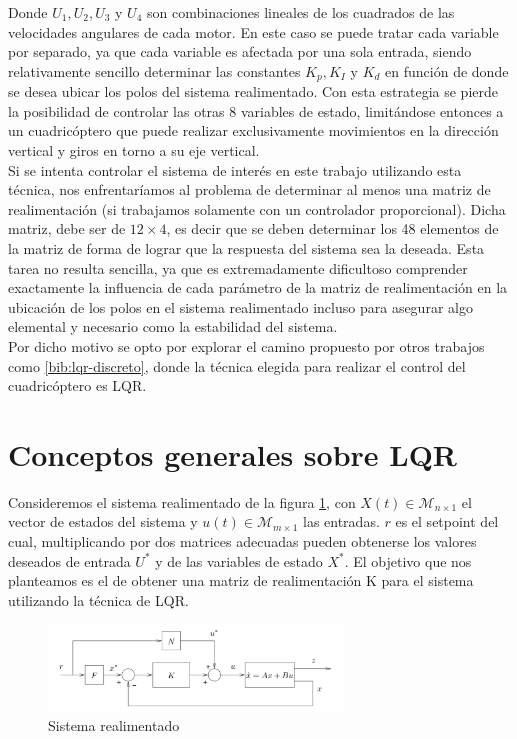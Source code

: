 \documentclass[main]{subfiles}
\begin{document}
Donde $U_1, U_2, U_3$ y $U_4$ son combinaciones lineales de los cuadrados de las velocidades angulares de cada motor. En este caso se puede tratar cada variable por separado, ya que cada variable es afectada por una sola entrada, siendo relativamente sencillo determinar las constantes $K_p, K_I$ y $K_d$ en funci\'on de donde se desea ubicar los polos del sistema realimentado. Con esta estrategia se pierde la posibilidad de controlar las otras 8 variables de estado, limit\'andose entonces a un cuadric\'optero que puede realizar exclusivamente movimientos en la direcci\'on vertical y giros en torno a su eje vertical.\\

Si se intenta controlar el sistema de inter\'es en este trabajo utilizando esta t\'ecnica, nos enfrentar\'iamos al problema de determinar al menos una matriz de realimentaci\'on (si trabajamos solamente con un controlador proporcional). Dicha matriz, debe ser de $12\times4$, es decir que se deben determinar los 48 elementos de la matriz de forma de lograr que la respuesta del sistema sea la deseada. Esta tarea no resulta sencilla, ya que es extremadamente dificultoso comprender exactamente la influencia de cada par\'ametro de la matriz de realimentaci\'on en la ubicaci\'on de los polos en el sistema realimentado incluso para asegurar algo elemental y necesario como la estabilidad del sistema.\\

Por dicho motivo se opto por explorar el camino propuesto por otros trabajos como \ref{bib:lqr-discreto}, donde la t\'ecnica elegida para realizar el control del cuadric\'optero es LQR.


\section{Conceptos generales sobre LQR}

Consideremos el sistema realimentado de la figura \ref{fig:bloque}, con $X(t)\in \mathcal{M}_{n\times1}$ el vector de estados del sistema y $u(t)\in \mathcal{M}_{m\times1}$ las entradas. $r$ es el setpoint del cual, multiplicando por dos matrices adecuadas pueden obtenerse los valores deseados de entrada $U^*$ y de las variables de estado $X^*$. El objetivo que nos planteamos es el de obtener una matriz de realimentaci\'on K para el sistema utilizando la t\'ecnica de LQR. 

\begin{figure}[h!]
	\centering
	\includegraphics[width=0.7\textwidth]{./pics_control/bloque.pdf}
	\caption{Sistema realimentado}
	\label{fig:bloque}
\end{figure}
 
\end{document}
